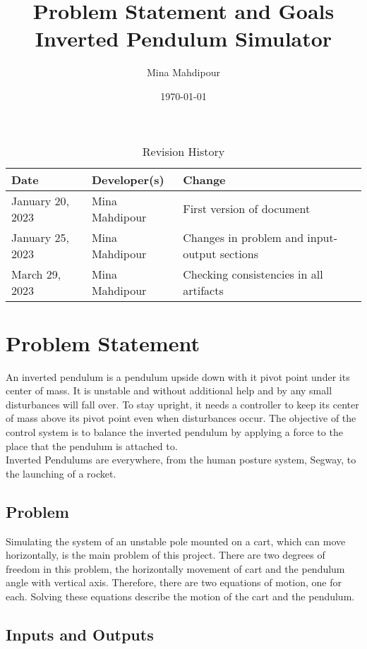 \documentclass{article}
\title{Problem Statement and Goals\\Inverted Pendulum Simulator}
\author{Mina Mahdipour}
\date{\today}
\begin{document}
\maketitle

\begin{table}[hp]
\caption{Revision History} \label{TblRevisionHistory}
\begin{tabularx}{\textwidth}{llX}
\toprule
\textbf{Date} & \textbf{Developer(s)} & \textbf{Change}\\
\midrule
January 20, 2023 & Mina Mahdipour & First version of document\\
January 25, 2023 & Mina Mahdipour & Changes in problem and input-output sections\\
March 29, 2023 & Mina Mahdipour & Checking consistencies in all artifacts\\
\bottomrule
\end{tabularx}
\end{table}

\section{Problem Statement}

An inverted pendulum is a pendulum upside down with it pivot point under its center of mass. It is unstable and without additional help and by any small disturbances will fall over. To stay upright, it needs a controller to keep its center of mass above its pivot point even when disturbances occur. The objective of the control system is to balance the inverted pendulum by applying a force to the place that the pendulum is attached to.\\
Inverted Pendulums are everywhere, from the human posture system, Segway, to the launching of a rocket.

\subsection{Problem}

Simulating the system of an unstable pole mounted on a cart, which can move horizontally, is the main problem of this project. There are two degrees of freedom in this problem, the horizontally movement of cart and the pendulum angle with vertical axis. Therefore, there are two equations of motion, one for each. Solving these equations describe the motion of the cart and the pendulum.

\subsection{Inputs and Outputs}
\end{document}
